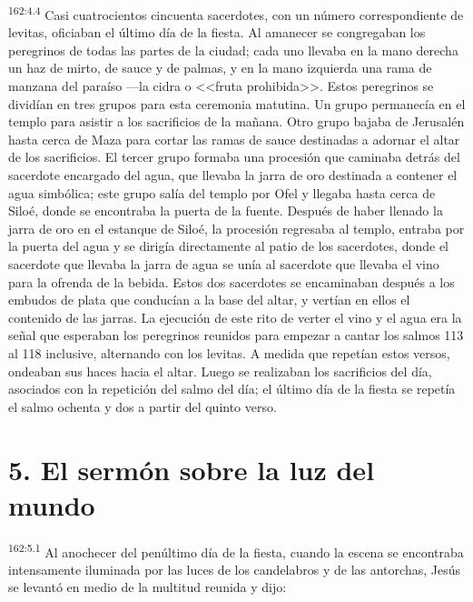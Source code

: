 \par 
\textsuperscript{162:4.4} Casi cuatrocientos cincuenta sacerdotes, con un número correspondiente de levitas, oficiaban el último día de la fiesta. Al amanecer se congregaban los peregrinos de todas las partes de la ciudad; cada uno llevaba en la mano derecha un haz de mirto, de sauce y de palmas, y en la mano izquierda una rama de manzana del paraíso ---la cidra o <<fruta prohibida>>. Estos peregrinos se dividían en tres grupos para esta ceremonia matutina. Un grupo permanecía en el templo para asistir a los sacrificios de la mañana. Otro grupo bajaba de Jerusalén hasta cerca de Maza para cortar las ramas de sauce destinadas a adornar el altar de los sacrificios. El tercer grupo formaba una procesión que caminaba detrás del sacerdote encargado del agua, que llevaba la jarra de oro destinada a contener el agua simbólica; este grupo salía del templo por Ofel y llegaba hasta cerca de Siloé, donde se encontraba la puerta de la fuente. Después de haber llenado la jarra de oro en el estanque de Siloé, la procesión regresaba al templo, entraba por la puerta del agua y se dirigía directamente al patio de los sacerdotes, donde el sacerdote que llevaba la jarra de agua se unía al sacerdote que llevaba el vino para la ofrenda de la bebida. Estos dos sacerdotes se encaminaban después a los embudos de plata que conducían a la base del altar, y vertían en ellos el contenido de las jarras. La ejecución de este rito de verter el vino y el agua era la señal que esperaban los peregrinos reunidos para empezar a cantar los salmos
113 al 118 inclusive, alternando con los levitas. A medida que repetían estos versos, ondeaban sus haces hacia el altar. Luego se realizaban los sacrificios del día, asociados con la repetición del salmo del día; el último día de la fiesta se repetía el salmo ochenta y dos a partir del quinto verso.

\section*{5. El sermón sobre la luz del mundo}
\par 
\textsuperscript{162:5.1} Al anochecer del penúltimo día de la fiesta, cuando la escena se encontraba intensamente iluminada por las luces de los candelabros y de las antorchas, Jesús se levantó en medio de la multitud reunida y dijo:

